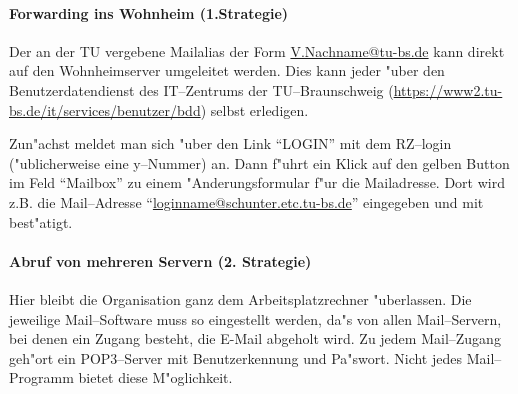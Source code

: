 \paragraph*{Forwarding ins Wohnheim (1.Strategie)}


Der an der TU vergebene Mailalias der Form \url{V.Nachname@tu-bs.de} kann
direkt auf den Wohnheimserver umgeleitet werden. Dies kann jeder "uber den
Benutzerdatendienst des IT--Zentrums der TU--Braunschweig
(\url{https://www2.tu-bs.de/it/services/benutzer/bdd}) selbst erledigen.

Zun"achst meldet man sich "uber den Link "`LOGIN"' mit dem RZ--login
("ublicherweise eine y--Nummer) an. Dann f"uhrt ein Klick auf den gelben
Button im Feld "`Mailbox"' zu einem "Anderungsformular f"ur die
Mailadresse. Dort wird z.B. die Mail--Adresse
"`\url{loginname@schunter.etc.tu-bs.de}"' eingegeben und mit 
best"atigt.

\paragraph*{Abruf von mehreren Servern (2. Strategie)}

Hier bleibt die Organisation ganz dem Arbeitsplatzrechner "uberlassen. Die
jeweilige Mail--Software muss so eingestellt werden, da"s von allen
Mail--Servern, bei denen ein Zugang besteht, die \glossar E-Mail abgeholt
wird. Zu jedem Mail--Zugang geh"ort ein POP3--Server mit Benutzerkennung und
Pa"swort. Nicht jedes Mail--Programm bietet diese M"oglichkeit.
